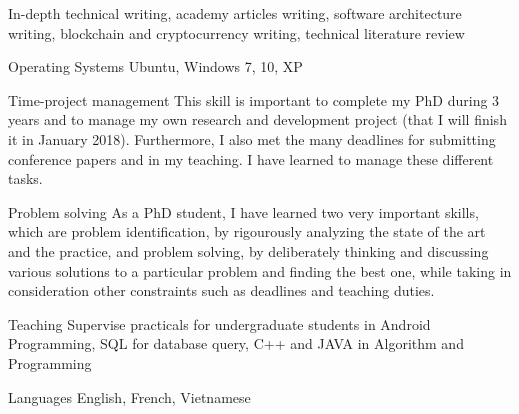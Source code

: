 \begin{cvskills}
{In-depth technical writing, academy articles writing, software architecture writing, blockchain and cryptocurrency writing, technical literature review}



\cvskill
{Operating Systems} %
{Ubuntu, Windows 7, 10, XP} %

\vspace{0.1cm}
\cvskill
{Time-project management} %
{This skill is important to complete my PhD during 3 years and to manage my own research and development project (that I will finish it in January 2018). Furthermore, I also met the many deadlines for submitting conference papers and in my teaching.
	I have learned to manage these different tasks.} %

\vspace{0.1cm}
\cvskill
{Problem solving} %
{As a PhD student, I have learned two very important skills, which are problem identification, by rigourously analyzing the state of the art and the practice, and problem solving, by deliberately thinking and discussing various solutions to a particular problem and finding the best one, while taking in consideration other constraints such as deadlines and teaching duties.} %

\vspace{0.1cm}
\cvskill
{Teaching}
{Supervise practicals for undergraduate students in Android Programming, SQL for database query, C++ and JAVA in Algorithm and Programming}

\vspace{0.1cm}
\cvskill
{Languages} %
{English, French, Vietnamese} %






\end{cvskills}
